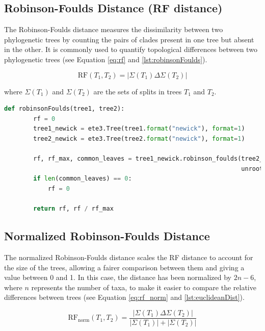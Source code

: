 \subsection{Robinson-Foulds Distance (RF distance)}\label{RF}
The Robinson-Foulds distance measures the dissimilarity between two phylogenetic trees by counting the pairs of clades present in one tree but absent in the other. It is commonly used to quantify topological differences between two phylogenetic trees (see Equation \eqref{eq:rf} and \autoref{lst:robinsonFoulds}).

\begin{equation}\label{eq:rf}
    \text{RF}(T_1, T_2) = | \Sigma(T_1) \Delta \Sigma(T_2) |
\end{equation}

where $\Sigma(T_1)$ and $\Sigma(T_2)$ are the sets of splits in trees $T_1$ and $T_2$.

\begin{lstlisting}[label=lst:robinsonFoulds,language=Python,caption=Python script for calculating the Robinson-Foulds distance using the ete3 package in the aPhyloGeo package.]
    def robinsonFoulds(tree1, tree2):
        rf = 0
        tree1_newick = ete3.Tree(tree1.format("newick"), format=1)
        tree2_newick = ete3.Tree(tree2.format("newick"), format=1)

        rf, rf_max, common_leaves = tree1_newick.robinson_foulds(tree2_newick, 
                                                                 unrooted_trees=True)
        if len(common_leaves) == 0:
            rf = 0

        return rf, rf / rf_max
\end{lstlisting}


\subsection{Normalized Robinson-Foulds Distance}\label{RFnorm}
The normalized Robinson-Foulds distance scales the RF distance to account for the size of the trees, allowing a fairer comparison between them and giving a value between 0 and 1. In this case, the distance has been normalized by $2n-6$, where $n$ represents the number of taxa, to make it easier to compare the relative differences between trees (see Equation \eqref{eq:rf_norm} and \autoref{lst:euclideanDist}).

\begin{equation}\label{eq:rf_norm}
    \text{RF}_{\text{norm}}(T_1, T_2) = \frac{| \Sigma(T_1) \Delta \Sigma(T_2) |}{| \Sigma(T_1) | + | \Sigma(T_2) |}
\end{equation}

